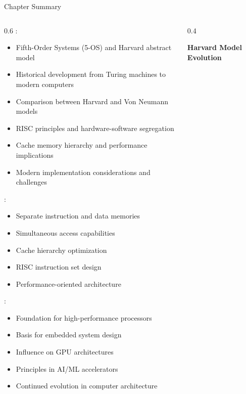 \begin{frame}{Chapter Summary}
\begin{columns}
\begin{column}{0.6\textwidth}
:
\begin{itemize}
\item Fifth-Order Systems (5-OS) and Harvard abstract model
\item Historical development from Turing machines to modern computers
\item Comparison between Harvard and Von Neumann models
\item RISC principles and hardware-software segregation
\item Cache memory hierarchy and performance implications
\item Modern implementation considerations and challenges
\end{itemize}

\vspace{0.3cm}
:
\begin{itemize}
\item Separate instruction and data memories
\item Simultaneous access capabilities
\item Cache hierarchy optimization
\item RISC instruction set design
\item Performance-oriented architecture
\end{itemize}

\vspace{0.3cm}
:
\begin{itemize}
\item Foundation for high-performance processors
\item Basis for embedded system design
\item Influence on GPU architectures
\item Principles in AI/ML accelerators
\item Continued evolution in computer architecture
\end{itemize}
\end{column}
\begin{column}{0.4\textwidth}
\begin{center}
\textbf{Harvard Model Evolution}
\vspace{0.3cm}

\end{center}
\end{column}
\end{columns}
\end{frame}

